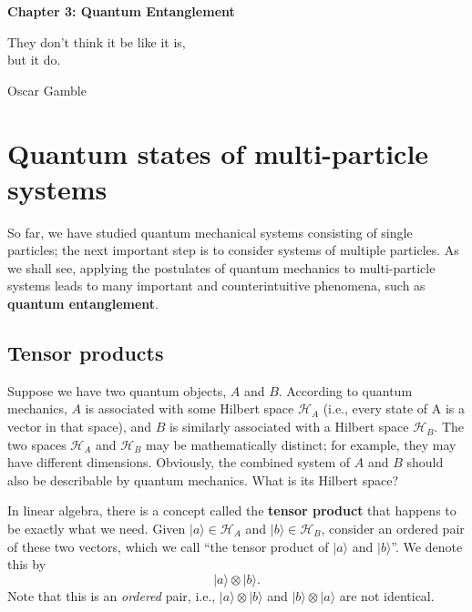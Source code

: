 \documentclass[prx,12pt]{revtex4-2}
\begin{document}
\setcounter{page}{36}

\begin{center}
{\Large \textbf{Chapter 3: Quantum Entanglement}}
\end{center}

\epigraph{They don't think it be like it is, \\but it do.}{Oscar Gamble}

\section{Quantum states of multi-particle systems}

So far, we have studied quantum mechanical systems consisting of
single particles; the next important step is to consider systems of
multiple particles.  As we shall see, applying the postulates of
quantum mechanics to multi-particle systems leads to many important
and counterintuitive phenomena, such as \textbf{quantum entanglement}.

\subsection{Tensor products}
\label{sec:tensorprod}

Suppose we have two quantum objects, $A$ and $B$.  According to
quantum mechanics, $A$ is associated with some Hilbert space
$\mathscr{H}_A$ (i.e., every state of A is a vector in that space),
and $B$ is similarly associated with a Hilbert space $\mathscr{H}_B$.
The two spaces $\mathscr{H}_A$ and $\mathscr{H}_B$ may be
mathematically distinct; for example, they may have different
dimensions.  Obviously, the combined system of $A$ and $B$ should also
be describable by quantum mechanics.  What is its Hilbert space?

In linear algebra, there is a concept called the \textbf{tensor
  product} that happens to be exactly what we need.  Given $|a\rangle
\in \mathscr{H}_A$ and $|b\rangle \in \mathscr{H}_B$, consider an
ordered pair of these two vectors, which we call ``the tensor product
of $|a\rangle$ and $|b\rangle$''.  We denote this by
\begin{equation*}
  |a\rangle \otimes |b\rangle.
\end{equation*}
Note that this is an \textit{ordered} pair, i.e.,
$|a\rangle\otimes|b\rangle$ and $|b\rangle\otimes|a\rangle$ are not
identical.
\end{document}
